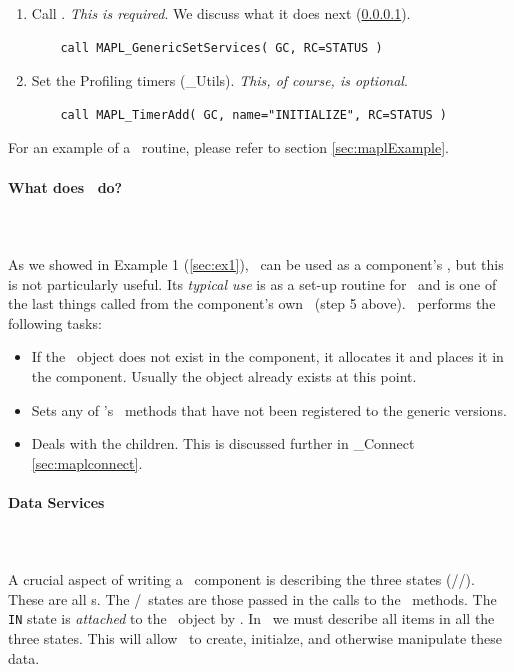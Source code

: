 \begin{enumerate}
\item Call \gssv. \emph{This is required}. We discuss what it does
  next (\ref{par:gssv}).
\begin{verbatim}
    call MAPL_GenericSetServices( GC, RC=STATUS )
\end{verbatim}

\item Set the Profiling timers (\ggn \_Utils). \emph{This, of course, is
  optional}.
\begin{verbatim}
    call MAPL_TimerAdd( GC, name="INITIALIZE", RC=STATUS )
\end{verbatim}
\end{enumerate}

For an example of a \ssv\ routine, please refer to section
\ref{sec:maplExample}.

\paragraph{What does \gssv\ do?}
\label{par:gssv}
\quad\\\\
As we showed in Example 1 (\ref{sec:ex1}), \gssv\ can be used as a
component's \ssv, but this is not particularly useful. Its \emph{typical use}
is as a set-up routine for \ggn\ and is one of the last things called
from the component's own \ssv\ (step 5 above). \gssv\ performs the
following tasks:
%
\begin{itemize}

\item If the \ggn\ object
  does not exist in the component, it allocates it and places it in the
  component. Usually the object already exists at this point.

\item Sets any of \egc's \IRF\ methods that have not been
  registered to the generic versions.

\item Deals with the children. This is discussed further in \ggn \_Connect
  \ref{sec:maplconnect}.

\end{itemize}

\paragraph{Data Services}
\label{sec:dataServices}
\quad\\\\
A crucial aspect of writing a \ggn\ component is describing the three
states (\IM/\EX/\gIN). These are all \stt s. The \IM/\EX\ states
are those passed in the calls to the \IRF\ methods. The {\tt IN}
state is \emph{attached} to the \ggn\  object by \ggn.
In \ssv\ we must describe all items in all the three states. This
will allow \ggn\ to create, initialze, and otherwise manipulate these data.

